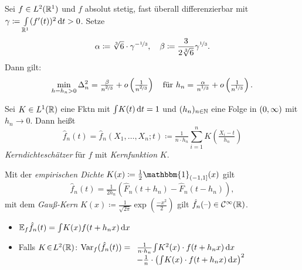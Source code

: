 \documentclass{cheat-sheet}
\newcommand{\E}{\mathbb{E}} %
\newcommand{\ind}{\mathbbm{1}} %
\newcommand{\Cont}{\mathcal{C}} %
\DeclareMathOperator{\var}{Var} %
\begin{document}
\begin{satz}
  Sei $f \in L^2(\mathbb{R}^1)$ und $f$ absolut stetig, \dh{} fast überall differenzierbar mit $\gamma \coloneqq {\textstyle \int\limits_{\mathbb{R}^1}^{}} (f'(t))^2 \,\mathrm{d} t > 0$.
  Setze
  \[
    \alpha \coloneqq \sqrt[3]{6} \cdot \gamma^{- \nicefrac{1}{3}}, \quad
    \beta \coloneqq \frac{3}{2 \sqrt[3]{6}} \gamma^{\nicefrac{1}{3}}.
  \]
  Dann gilt:
  \[
    \min_{h = h_n > 0} \Delta_n^2 = \tfrac{\beta}{n^{\nicefrac{2}{3}}} + o \left( \tfrac{1}{n^{\nicefrac{2}{3}}} \right) \quad
    \text{für }
    h_n = \tfrac{\alpha}{n^{\nicefrac{1}{3}}} + o \left( \tfrac{1}{n^{\nicefrac{1}{3}}} \right).
  \]
\end{satz}

\begin{defn}
  Sei $K \in L^1(\mathbb{R})$ eine Fktn mit ${\textstyle \int} K(t) \,\mathrm{d} t = 1$ und $(h_n)_{n \in \mathbb{N}}$ eine Folge in $\left( 0, \infty \right)$ mit $h_n \to 0$.
  Dann heißt
  \[
    \hat{f}_n(t) = \hat{f}_n(X_1, \ldots, X_n; t) \coloneqq \tfrac{1}{n \cdot h_n} \sum_{i=1}^n K \left( \tfrac{X_i - t}{h_n} \right)
  \]
  \emph{Kerndichteschätzer} für $f$ mit \emph{Kernfunktion} $K$.
\end{defn}

\begin{bspe}
  Mit der \emph{empirischen Dichte} $K(x) \coloneqq \tfrac{1}{2} \ind_{\ocinterval{-1}{1}}(x)$ gilt
  \[ \hat{f}_n(t) = \tfrac{1}{2 h_n} \left( \hat{F}_n(t + h_n) - \hat{F}_n(t - h_n) \right), \]
  mit dem \emph{Gauß-Kern} $K(x) \coloneqq \tfrac{1}{\sqrt{2 \pi}}\exp( \tfrac{- x^2}{2})$ gilt $\hat{f}_n(\blank) \in \Cont^\infty(\R)$.
\end{bspe}

\begin{lem}
  \begin{itemize}
    \item $\E_f \hat{f}_n(t) = \IInt{K(x) f(t + h_n x)}{x}$
    \item Falls $K \!\in\! L^2(\mathbb{R})$: \enspace
    $\var_f (\hat{f}_n(t)) = 
    \begin{array}[t]{l}
      \tfrac{1}{n \cdot h_n} \IInt{K^2(x) \cdot f(t + h_n x)}{x} \\
      - \tfrac{1}{n} \cdot \left( \IInt{K(x) \cdot f(t + h_n x)}{x} \right)^2
    \end{array}$
  \end{itemize}
\end{lem}
\end{document}
